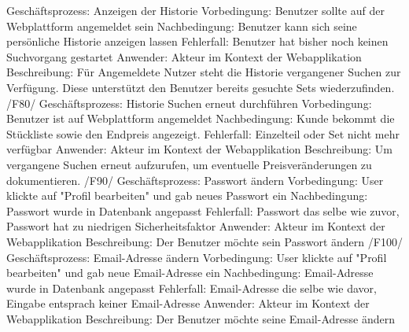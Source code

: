 Geschäftsprozess: Anzeigen der Historie\newline
Vorbedingung: Benutzer sollte auf der Webplattform angemeldet sein\newline
Nachbedingung: Benutzer kann sich seine persönliche Historie anzeigen lassen\newline
Fehlerfall: Benutzer hat bisher noch keinen Suchvorgang gestartet\newline
Anwender: Akteur im Kontext der Webapplikation\newline
Beschreibung: Für Angemeldete Nutzer steht die Historie vergangener Suchen zur Verfügung. Diese unterstützt den Benutzer bereits gesuchte Sets wiederzufinden.\newline\newline
/F80/ \newline
Geschäftsprozess: Historie Suchen erneut durchführen \newline
Vorbedingung: Benutzer ist auf Webplattform angemeldet \newline
Nachbedingung: Kunde bekommt die Stückliste sowie den Endpreis angezeigt.\newline 
Fehlerfall: Einzelteil oder Set nicht mehr verfügbar \newline
Anwender: Akteur im Kontext der Webapplikation \newline
Beschreibung: Um vergangene Suchen erneut aufzurufen, um eventuelle  Preisveränderungen zu dokumentieren. \newline \newline \newline
/F90/ \newline
Geschäftsprozess: Passwort ändern \newline
Vorbedingung: User klickte auf "Profil bearbeiten" und gab neues Passwort ein \newline
Nachbedingung: Passwort wurde in Datenbank angepasst \newline
Fehlerfall: Passwort das selbe wie zuvor, Passwort hat zu niedrigen Sicherheitsfaktor \newline
Anwender: Akteur im Kontext der Webapplikation \newline
Beschreibung: Der Benutzer möchte sein Passwort ändern \newline \newline
/F100/ \newline
Geschäftsprozess: Email-Adresse ändern \newline
Vorbedingung: User klickte auf "Profil bearbeiten" und gab neue Email-Adresse ein \newline
Nachbedingung: Email-Adresse wurde in Datenbank angepasst \newline
Fehlerfall: Email-Adresse die selbe wie davor, Eingabe entsprach keiner Email-Adresse \newline
Anwender: Akteur im Kontext der Webapplikation \newline
Beschreibung: Der Benutzer möchte seine Email-Adresse ändern \newline \newline

